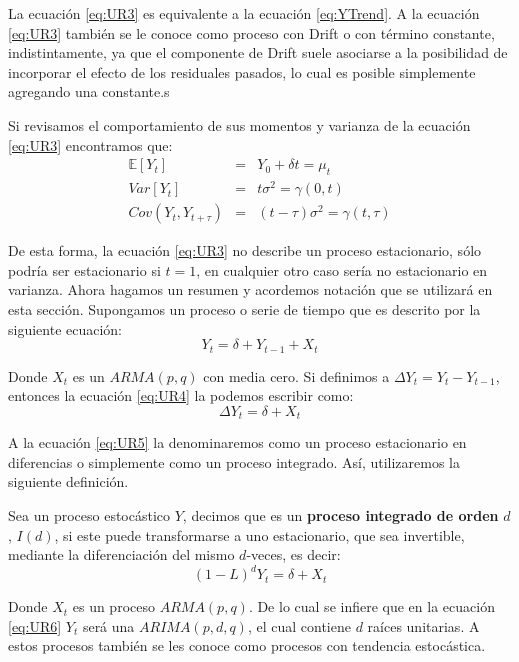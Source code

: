 \documentclass[
]{book}
\begin{document}
La ecuación \eqref{eq:UR3} es equivalente a la ecuación \eqref{eq:YTrend}. A la ecuación \eqref{eq:UR3} también se le conoce como proceso con Drift o con término constante, indistintamente, ya que el componente de Drift suele asociarse a la posibilidad de incorporar el efecto de los residuales pasados, lo cual es posible simplemente agregando una constante.s

Si revisamos el comportamiento de sus momentos y varianza de la ecuación \eqref{eq:UR3} encontramos que:
\begin{eqnarray*}
    \mathbb{E}[Y_t] & = & Y_0 + \delta t = \mu_t \\
    Var[Y_t] & = & t \sigma^2 = \gamma(0, t) \\
    Cov(Y_t, Y_{t+\tau}) & = & (t - \tau) \sigma^2 = \gamma(t, \tau)
\end{eqnarray*}

De esta forma, la ecuación \eqref{eq:UR3} no describe un proceso estacionario, sólo podría ser estacionario si \(t = 1\), en cualquier otro caso sería no estacionario en varianza. Ahora hagamos un resumen y acordemos notación que se utilizará en esta sección. Supongamos un proceso o serie de tiempo que es descrito por la siguiente ecuación:
\begin{equation}
    Y_t = \delta + Y_{t-1} + X_t
    \label{eq:UR4}
\end{equation}

Donde \(X_t\) es un \(ARMA(p, q)\) con media cero. Si definimos a \(\Delta Y_t = Y_t - Y_{t-1}\), entonces la ecuación \eqref{eq:UR4} la podemos escribir como:
\begin{equation}
    \Delta Y_t = \delta + X_t
    \label{eq:UR5}
\end{equation}

A la ecuación \eqref{eq:UR5} la denominaremos como un proceso estacionario en diferencias o simplemente como un proceso integrado. Así, utilizaremos la siguiente definición.

Sea un proceso estocástico \(Y\), decimos que es un \textbf{proceso integrado de orden} \(d\), \(I(d)\), si este puede transformarse a uno estacionario, que sea invertible, mediante la diferenciación del mismo \(d\)-veces, es decir:
\begin{equation}
    (1 - L)^d Y_t = \delta + X_t
    \label{eq:UR6}
\end{equation}

Donde \(X_t\) es un proceso \(ARMA(p, q)\). De lo cual se infiere que en la ecuación \eqref{eq:UR6} \(Y_t\) será una \(ARIMA(p, d, q)\), el cual contiene \(d\) raíces unitarias. A estos procesos también se les conoce como procesos con tendencia estocástica.
\end{document}
